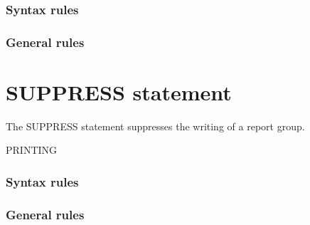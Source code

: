 \begin{syntax}




\end{syntax}

\subsubsection{Syntax rules}

\subsubsection{General rules}

\section{SUPPRESS statement}

The SUPPRESS statement suppresses the writing of a report group.

\begin{syntax}
   PRINTING
\end{syntax}

\subsubsection{Syntax rules}

\subsubsection{General rules}

